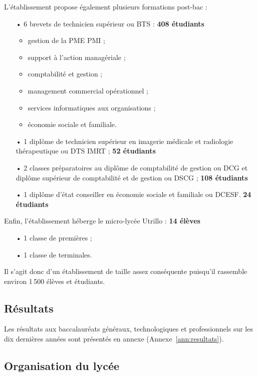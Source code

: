 \documentclass[12pt,a4paper, fleqn]{report}
\begin{document}
L'établissement propose également plusieurs formations post-bac :
\begin{itemize}
\item[•] 6 brevets de technicien supérieur ou BTS : \hfill \textbf{408 étudiants}
\begin{itemize}
\item gestion de la PME PMI ;
\item support à l'action managériale ;
\item comptabilité et gestion ;
\item management commercial opérationnel ;
\item services informatiques aux organisations ;
\item économie sociale et familiale.
\end{itemize}
\item[•] 1 diplôme de technicien supérieur en imagerie médicale et radiologie thérapeutique ou DTS IMRT ; \hfill \textbf{52 étudiants}
\item[•] 2 classes préparatoires au diplôme de comptabilité de gestion ou DCG et diplôme supérieur de comptabilité et de gestion ou DSCG ; \hfill \textbf{108 étudiants}
\item[•] 1 diplôme d'état conseiller en économie sociale et familiale ou DCESF. \hfill \textbf{24 étudiants}
\end{itemize}

Enfin, l'établissement héberge le micro-lycée Utrillo : \hfill \textbf{14 élèves}
\begin{itemize}
\item[•] 1 classe de premières ;
\item[•] 1 classe de terminales.
\end{itemize}

Il s'agit donc d'un établissement de taille assez conséquente puisqu'il rassemble environ 1\,500 élèves et étudiants.

\subsection{Résultats}

Les résultats aux baccalauréats généraux, technologiques et professionnels sur les dix dernières années sont présentés en annexe (Annexe~\ref{ann:resultats}).

\subsection{Organisation du lycée}
\end{document}
